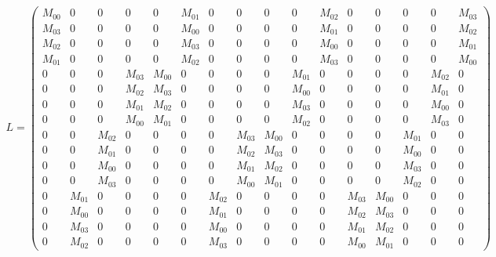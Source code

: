 \documentclass[11pt,a4paper]{article}
\begin{document}
\begin{eqnarray*}
  L = \left(\begin{array}{rrrrrrrrrrrrrrrr}
    M_{00} & 0 & 0 & 0 & 0 & M_{01} & 0 & 0 & 0 & 0 & M_{02} & 0 & 0 & 0 & 0 & M_{03} \\
    M_{03} & 0 & 0 & 0 & 0 & M_{00} & 0 & 0 & 0 & 0 & M_{01} & 0 & 0 & 0 & 0 & M_{02} \\
    M_{02} & 0 & 0 & 0 & 0 & M_{03} & 0 & 0 & 0 & 0 & M_{00} & 0 & 0 & 0 & 0 & M_{01} \\
    M_{01} & 0 & 0 & 0 & 0 & M_{02} & 0 & 0 & 0 & 0 & M_{03} & 0 & 0 & 0 & 0 & M_{00} \\
    0 & 0 & 0 & M_{03} & M_{00} & 0 & 0 & 0 & 0 & M_{01} & 0 & 0 & 0 & 0 & M_{02} & 0 \\
    0 & 0 & 0 & M_{02} & M_{03} & 0 & 0 & 0 & 0 & M_{00} & 0 & 0 & 0 & 0 & M_{01} & 0 \\
    0 & 0 & 0 & M_{01} & M_{02} & 0 & 0 & 0 & 0 & M_{03} & 0 & 0 & 0 & 0 & M_{00} & 0 \\
    0 & 0 & 0 & M_{00} & M_{01} & 0 & 0 & 0 & 0 & M_{02} & 0 & 0 & 0 & 0 & M_{03} & 0 \\
    0 & 0 & M_{02} & 0 & 0 & 0 & 0 & M_{03} & M_{00} & 0 & 0 & 0 & 0 & M_{01} & 0 & 0 \\
    0 & 0 & M_{01} & 0 & 0 & 0 & 0 & M_{02} & M_{03} & 0 & 0 & 0 & 0 & M_{00} & 0 & 0 \\
    0 & 0 & M_{00} & 0 & 0 & 0 & 0 & M_{01} & M_{02} & 0 & 0 & 0 & 0 & M_{03} & 0 & 0 \\
    0 & 0 & M_{03} & 0 & 0 & 0 & 0 & M_{00} & M_{01} & 0 & 0 & 0 & 0 & M_{02} & 0 & 0 \\
    0 & M_{01} & 0 & 0 & 0 & 0 & M_{02} & 0 & 0 & 0 & 0 & M_{03} & M_{00} & 0 & 0 & 0 \\
    0 & M_{00} & 0 & 0 & 0 & 0 & M_{01} & 0 & 0 & 0 & 0 & M_{02} & M_{03} & 0 & 0 & 0 \\
    0 & M_{03} & 0 & 0 & 0 & 0 & M_{00} & 0 & 0 & 0 & 0 & M_{01} & M_{02} & 0 & 0 & 0 \\
    0 & M_{02} & 0 & 0 & 0 & 0 & M_{03} & 0 & 0 & 0 & 0 & M_{00} & M_{01} & 0 & 0 & 0
    \end{array}\right)
\end{eqnarray*}



\end{document}

